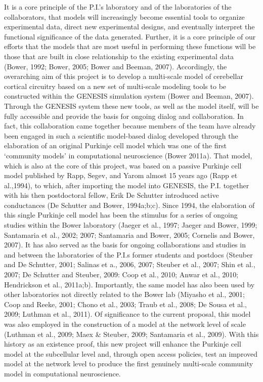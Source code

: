 \documentclass[12pt]{article}
\begin{document}
\noindent It is a core principle of the P.I.'s laboratory and of the laboratories of the collaborators, that models will increasingly become essential tools to organize experimental data, direct new experimental designs, and eventually interpret the functional significance of the data generated. Further, it is a core principle of our efforts that the models that are most useful in performing these functions will be those that are built in close relationship to the existing experimental data (Bower, 1992; Bower, 2005; Bower and Beeman, 2007). Accordingly, the overarching aim of this project is to develop a multi-scale model of cerebellar cortical circuitry based on a new set of multi-scale modeling tools to be constructed within the GENESIS simulation system (Bower and Beeman, 2007). Through the GENESIS system these new tools, as well as the model itself, will be fully accessible and provide the basis for ongoing dialog and collaboration. In fact, this collaboration came together because members of the team have already been engaged in such a scientific model-based dialog developed through the elaboration of an original Purkinje cell model which was one of the first `community models' in computational neuroscience (Bower 2011a). That model, which is also at the core of this project, was based on a passive Purkinje cell model published by Rapp, Segev, and Yarom almost 15 years ago (Rapp et al.,1994), to which, after importing the model into GENESIS, the P.I. together with his then postdoctoral fellow, Erik De Schutter introduced active conductances (De Schutter and Bower, 1994a;b;c). Since 1994, the elaboration of this single Purkinje cell model has been the stimulus for a series of ongoing studies within the Bower laboratory (Jaeger et al., 1997; Jaeger and Bower, 1999; Santamaria et al., 2002; 2007; Santamaria and Bower, 2005; Cornelis and Bower, 2007). It has also served as the basis for ongoing collaborations and studies in and between the laboratories of the P.I.s former students and postdocs (Steuber and De Schutter, 2001; Salinas et a., 2006, 2007; Steuber et al., 2007; Shin et al., 2007; De Schutter and Steuber, 2009: Coop et al., 2010; Anwar et al., 2010; Hendrickson et al., 2011a;b). Importantly, the same model has also been used by other laboratories not directly related to the Bower lab (Miyasho et al., 2001; Coop and Reeke, 2001; Chono et al., 2003; Traub et al., 2008; De Sousa et al., 2009; Luthman et al., 2011). Of significance to the current proposal, this model was also employed in the construction of a model at the network level of scale (Luthman et al., 2009; Maex \& Steuber, 2009; Santamaria et al., 2009). With this history as an existence proof, this new project will enhance the Purkinje cell model at the subcellular level and, through open access policies, test an improved model at the network level to produce the first genuinely multi-scale community model in computational neuroscience.\\
\end{document}
